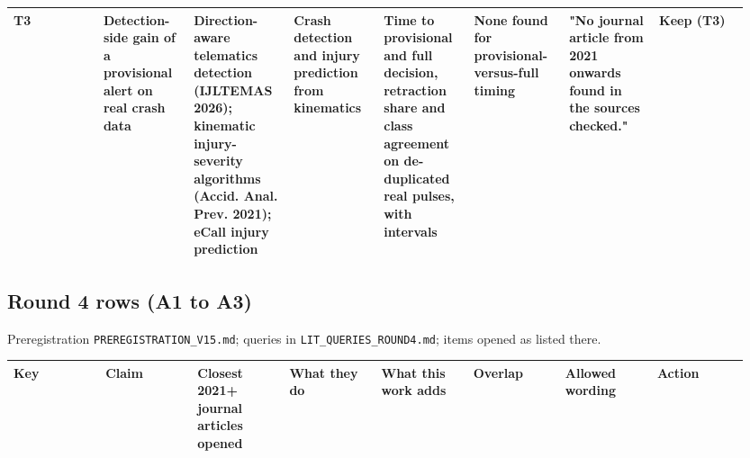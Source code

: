 {\begin{longtable}{p{0.119\linewidth}p{0.119\linewidth}p{0.119\linewidth}p{0.119\linewidth}p{0.119\linewidth}p{0.119\linewidth}p{0.119\linewidth}p{0.119\linewidth}}
T3 & Detection-side gain of a provisional alert on real crash data & Direction-aware telematics detection (IJLTEMAS 2026); kinematic injury-severity algorithms (Accid. Anal. Prev. 2021); eCall injury prediction & Crash detection and injury prediction from kinematics & Time to provisional and full decision, retraction share and class agreement on de-duplicated real pulses, with intervals & None found for provisional-versus-full timing & "No journal article from 2021 onwards found in the sources checked." & Keep (T3) \\
\bottomrule
\end{longtable}}

\subsection*{Round 4 rows (A1 to A3)}

Preregistration \texttt{PREREGISTRATION\_V15.md}; queries in \texttt{LIT\_QUERIES\_ROUND4.md}; items opened as listed there.

{\scriptsize\raggedright
\begin{longtable}{p{0.119\linewidth}p{0.119\linewidth}p{0.119\linewidth}p{0.119\linewidth}p{0.119\linewidth}p{0.119\linewidth}p{0.119\linewidth}p{0.119\linewidth}}
\toprule
Key & Claim & Closest 2021+ journal articles opened & What they do & What this work adds & Overlap & Allowed wording & Action \\
\midrule
\endhead
\bottomrule
\end{longtable}}

